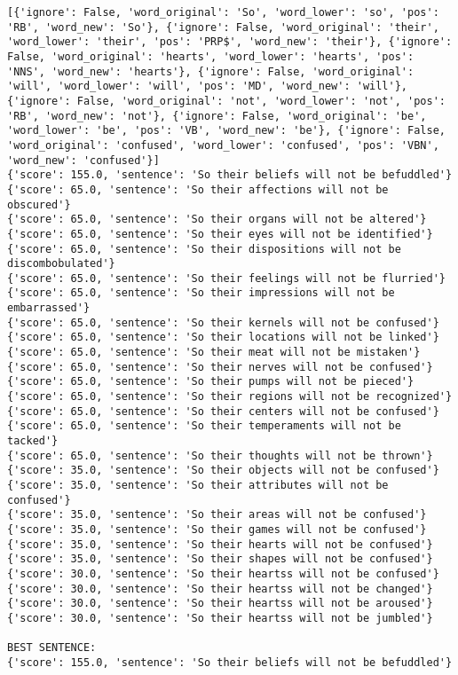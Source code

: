 \documentclass[12pt,a4paper,oneside]{book}
\begin{document}
\begin{verbatim}
[{'ignore': False, 'word_original': 'So', 'word_lower': 'so', 'pos': 'RB', 'word_new': 'So'}, {'ignore': False, 'word_original': 'their', 'word_lower': 'their', 'pos': 'PRP$', 'word_new': 'their'}, {'ignore': False, 'word_original': 'hearts', 'word_lower': 'hearts', 'pos': 'NNS', 'word_new': 'hearts'}, {'ignore': False, 'word_original': 'will', 'word_lower': 'will', 'pos': 'MD', 'word_new': 'will'}, {'ignore': False, 'word_original': 'not', 'word_lower': 'not', 'pos': 'RB', 'word_new': 'not'}, {'ignore': False, 'word_original': 'be', 'word_lower': 'be', 'pos': 'VB', 'word_new': 'be'}, {'ignore': False, 'word_original': 'confused', 'word_lower': 'confused', 'pos': 'VBN', 'word_new': 'confused'}]
{'score': 155.0, 'sentence': 'So their beliefs will not be befuddled'}
{'score': 65.0, 'sentence': 'So their affections will not be obscured'}
{'score': 65.0, 'sentence': 'So their organs will not be altered'}
{'score': 65.0, 'sentence': 'So their eyes will not be identified'}
{'score': 65.0, 'sentence': 'So their dispositions will not be discombobulated'}
{'score': 65.0, 'sentence': 'So their feelings will not be flurried'}
{'score': 65.0, 'sentence': 'So their impressions will not be embarrassed'}
{'score': 65.0, 'sentence': 'So their kernels will not be confused'}
{'score': 65.0, 'sentence': 'So their locations will not be linked'}
{'score': 65.0, 'sentence': 'So their meat will not be mistaken'}
{'score': 65.0, 'sentence': 'So their nerves will not be confused'}
{'score': 65.0, 'sentence': 'So their pumps will not be pieced'}
{'score': 65.0, 'sentence': 'So their regions will not be recognized'}
{'score': 65.0, 'sentence': 'So their centers will not be confused'}
{'score': 65.0, 'sentence': 'So their temperaments will not be tacked'}
{'score': 65.0, 'sentence': 'So their thoughts will not be thrown'}
{'score': 35.0, 'sentence': 'So their objects will not be confused'}
{'score': 35.0, 'sentence': 'So their attributes will not be confused'}
{'score': 35.0, 'sentence': 'So their areas will not be confused'}
{'score': 35.0, 'sentence': 'So their games will not be confused'}
{'score': 35.0, 'sentence': 'So their hearts will not be confused'}
{'score': 35.0, 'sentence': 'So their shapes will not be confused'}
{'score': 30.0, 'sentence': 'So their heartss will not be confused'}
{'score': 30.0, 'sentence': 'So their heartss will not be changed'}
{'score': 30.0, 'sentence': 'So their heartss will not be aroused'}
{'score': 30.0, 'sentence': 'So their heartss will not be jumbled'}

BEST SENTENCE:
{'score': 155.0, 'sentence': 'So their beliefs will not be befuddled'}



\end{verbatim}
\end{document}
